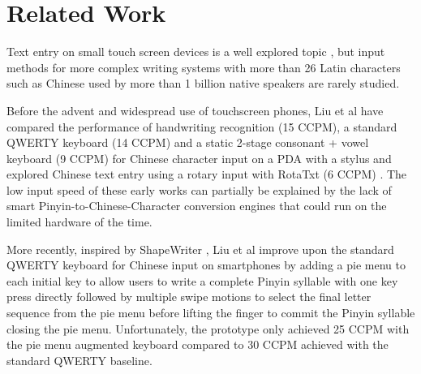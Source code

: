 \chapter{Related Work}
\label{c:related}




Text entry on small touch screen devices is a well explored topic \cite{Chen:2014:STE:2642918.2647354}\cite{Oney:2013:ZDQ:2470654.2481387}\cite{Shao:2016:SSK:2935334.2935336}\cite{Yi:2017:CRK:3025453.3025454}, but input methods for more complex writing systems with more than 26 Latin characters \cite{Lunde:2008:CIP:1525605} such as Chinese used by more than 1 billion native speakers are rarely studied.

Before the advent and widespread use of touchscreen phones, Liu et al have compared the performance of handwriting recognition (15 CCPM), a standard QWERTY keyboard (14 CCPM) and a static 2-stage consonant + vowel keyboard (9 CCPM) \cite{Liu:2009:IUP:1613858.1613928} for Chinese character input on a PDA with a stylus and explored Chinese text entry using a rotary input with RotaTxt (6 CCPM) \cite{Liu:2008:RCP:1409240.1409265}. The low input speed of these early works can partially be explained by the lack of smart Pinyin-to-Chinese-Character conversion engines that could run on the limited hardware of the time.

More recently, inspired by ShapeWriter \cite{Zhai:2003:SWS:642611.642630}, Liu et al \cite{Liu:2012:PPM:2371574.2371614} improve upon the standard QWERTY keyboard for Chinese input on smartphones by adding a pie menu to each initial key to allow users to write a complete Pinyin syllable with one key press directly followed by multiple swipe motions to select the final letter sequence from the pie menu before lifting the finger to commit the Pinyin syllable closing the pie menu. Unfortunately, the prototype only achieved 25 CCPM with the pie menu augmented keyboard compared to 30 CCPM achieved with the standard QWERTY baseline.
